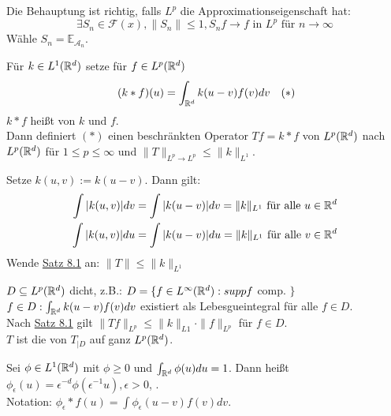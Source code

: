 \begin{beweis}
	Die Behauptung ist richtig, falls $L^{p}$ die Approximationseigenschaft hat:
	\[ \exists S_{n} \in \mathcal{F}(x), \| S_{n} \| \leq 1, S_{n} f \rightarrow f \text{ in } L^{p} \text{ für } n \rightarrow \infty \]
	Wähle $S_{n} = \mathds{E}_{\mathcal{A}_{n}}$.
\end{beweis}

\begin{satz}[Young] \label{satz:8.5-young}
	Für $k \in L^{1}(\mathbb{R}^{d})$ setze für $f \in L^{p}(\mathbb{R}^{d})$
	\[ (k \ast f) (u) = \int_{\MdR^{d}} k(u - v) f(v) dv \quad (*) \label{eq:8.5-young} \]
	$k \ast f$ hei{\ss}t  von $k$ und $f$. \\
	Dann definiert \hyperref[eq:8.5-young]{$(*)$} einen beschränkten Operator $T f = k \ast f$ von $L^{p}(\mathbb{R}^{d})$ nach $L^{p}(\mathbb{R}^{d})$ für $1 \leq p \leq \infty$ und $\|T\|_{L^{p} \rightarrow L^{p}} \leq \|k\|_{L^{1}}$.
\end{satz}

\begin{beweis}
	Setze $k(u, v) := k(u - v)$. Dann gilt:
	\begin{align*}
		\int |k(u, v)| dv & = \int | k(u - v) | dv = \| k \|_{L^{1}} \text{ für alle } u \in \mathbb{R}^{d} \\
			\int |k(u, v)| d u& = \int | k(u - v) | du = \| k \|_{L^{1}} \text{ für alle } v \in \mathbb{R}^{d} \\
	\end{align*}	
	Wende \hyperref[satz:8.1]{Satz 8.1} an: $\| T \| \leq \| k \|_{L^{1}}$
\end{beweis}

\begin{bemerkung*}
	$D \subseteq L^{p}(\mathbb{R}^{d})$ dicht, z.B.: $D = \{ f \in L^{\infty}(\mathbb{R}^{d}): supp f$ comp. $\}$ %
	$f \in D: \int_{\mathbb{R}^{d}} k(u - v) f(v) dv$ existiert als Lebesgueintegral für alle $f \in D$. \\
	Nach \hyperref[satz:8.1]{Satz 8.1} gilt $\| T f \|_{L^{p}} \leq \| k \|_{L{1}} \cdot \| f \|_{L^{p}}$ für $f \in D$. \\
	$T$ ist die  von $T_{\big| D}$ auf ganz $L^{p}(\mathbb{R}^{d})$.
\end{bemerkung*}

\begin{definition}
	Sei $\phi \in L^{1}(\mathbb{R}^{d})$ mit $\phi \geq 0$ und $\int_{\mathbb{R}^{d}} \phi(u) du = 1$. Dann hei{\ss}t $\phi_{\epsilon}(u) = \epsilon^{-d} \phi(\epsilon^{-1} u), \epsilon > 0$,	. \\
	Notation: $\phi_{\epsilon} \ast f(u) = \int \phi_{\epsilon}(u - v) f(v) dv$.
\end{definition}

